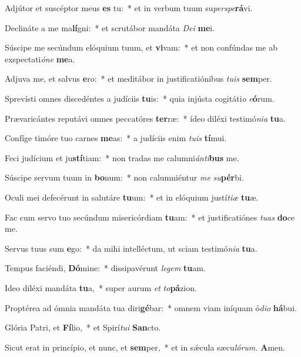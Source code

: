 \item Adjútor et suscéptor meus \textbf{es} tu:~* et in verbum tuum su\hspace*{0.01em}\textit{perspe}\textbf{rá}vi.
\item Declináte a me ma\textbf{lí}gni:~* et scrutábor mandáta \textit{Dei} \textbf{me}i.
\item Súscipe me secúndum elóquium tuum, et \textbf{vi}vam:~* et non confúndas me ab exspectati\textit{óne} \textbf{me}a.
\item Adjuva me, et salvus \textbf{e}ro:~* et meditábor in justificatiónibus \textit{tuis} \textbf{sem}per.
\item Sprevísti omnes discedéntes a judíciis \textbf{tu}is:~* quia injústa cogitáti\textit{o} \textit{e}\textbf{ó}rum.
\item Prævaricántes reputávi omnes peccatóres \textbf{ter}ræ:~* ídeo diléxi testimó\textit{nia} \textbf{tu}a.
\item Confíge timóre tuo carnes \textbf{me}as:~* a judíciis enim \textit{tuis} \textbf{tí}mui.
\item Feci judícium et ju\textbf{stí}tiam:~* non tradas me calumni\textit{ánti}\textbf{bus} me.
\item Súscipe servum tuum in \textbf{bo}num:~* non calumniéntur \textit{me} \textit{su}\textbf{pér}bi.
\item Oculi mei defecérunt in salutáre \textbf{tu}um:~* et in elóquium justí\textit{tiæ} \textbf{tu}æ.
\item Fac cum servo tuo secúndum misericórdiam \textbf{tu}am:~* et justificatiónes \textit{tuas} \textbf{do}ce me.
\item Servus tuus sum \textbf{e}go:~* da mihi intelléctum, ut sciam testimó\textit{nia} \textbf{tu}a.
\item Tempus faciéndi, \textbf{Dó}mine:~* dissipavérunt \textit{legem} \textbf{tu}am.
\item Ideo diléxi mandáta \textbf{tu}a,~* super aurum \textit{et} \textit{to}\textbf{pá}zion.
\item Proptérea ad ómnia mandáta tua diri\textbf{gé}bar:~* omnem viam iníquam ó\hspace*{0.02em}\textit{dio} \textbf{há}bui.
\item Glória Patri, et \textbf{Fí}lio,~* et Spirí\tinyhspace\textit{tui} \textbf{San}cto.
\item Sicut erat in princípio, et nunc, et \textbf{sem}per,~* et in sǽcula sæcu\tinyhspace\textit{lórum.} \textbf{A}men.